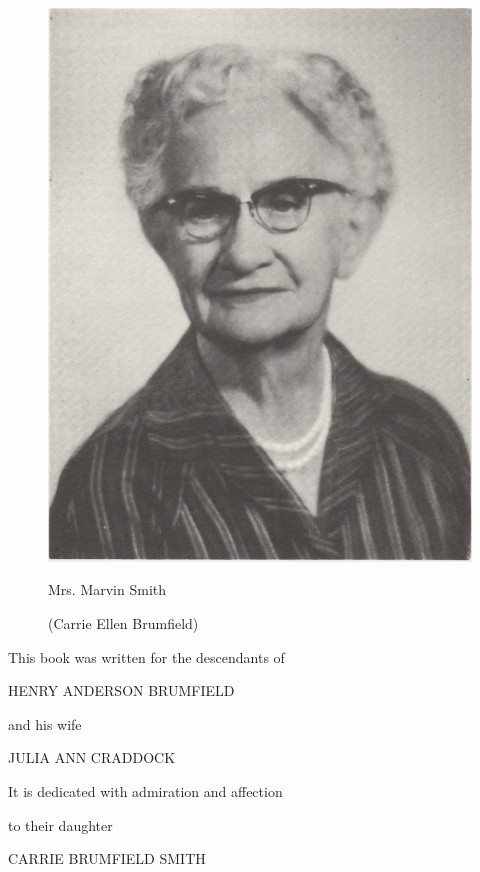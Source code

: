 \vspace*{.15\textheight}
\begin{figure}[h]
\centering
\includegraphics[width=.7\textwidth]{carrie.jpg}
\vspace*{.1\textheight}

Mrs. Marvin Smith

(Carrie Ellen Brumfield)
\end{figure}
\pagebreak
\vspace*{.2\textheight}
\begin{center}

This book was written for the descendants of
\vspace*{.02\textheight}

HENRY ANDERSON BRUMFIELD
\vspace*{.01\textheight}

and his wife
\vspace*{.01\textheight}

JULIA ANN CRADDOCK
\end{center}
\vspace{.2\textheight}
 
\begin{center}
It is dedicated with admiration and affection
\vspace*{.01\textheight}

to their daughter
\vspace*{.02\textheight}

CARRIE BRUMFIELD SMITH
\end{center}

 
